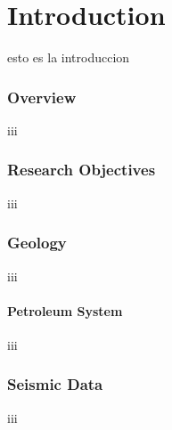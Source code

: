 \chapter{Introduction}
esto es la introduccion

\subsection{Overview}
iii
 
\subsection{Research Objectives}
iii

\subsection{Geology}
iii

\subsubsection{Petroleum System}
iii

\subsection{Seismic Data}
iii

\clearpage


   
   
